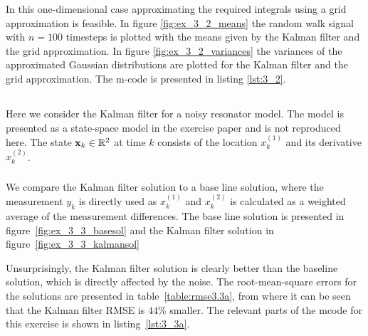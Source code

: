 \documentclass[a4paper,oneside,article]{memoir}
\begin{document}
In this one-dimensional case approximating the required
integrals using a grid approximation is feasible. In figure \ref{fig:ex_3_2_means}
the random walk signal with $n=100$ timesteps is plotted with the means given
by the Kalman filter and the grid approximation. In figure \ref{fig:ex_3_2_variances}
the variances of the approximated Gaussian distributions are plotted for 
the Kalman filter and the grid approximation. The m-code is presented in listing \ref{lst:3_2}. 

\clearpage


\subsection{}\label{sec:3_3}
Here we consider the Kalman filter for a noisy resonator model. The model
is presented as a state-space model in the exercise paper and is not
reproduced here. The state $\mathbf{x}_k\in\mathbb{R}^2$ at time $k$ consists
of the location $x_k^{(1)}$ and its derivative $x_k^{(2)}$. 

\subsubsection{}\label{sec:3_3a}
We compare the Kalman filter solution to a base line solution, where the
measurement $y_k$ is directly used as $x_k^{(1)}$ and $x_k^{(2)}$ is calculated
as a weighted average of the measurement differences. The base line solution is
presented in figure~\ref{fig:ex_3_3_basesol} and the Kalman filter solution in 
figure~\ref{fig:ex_3_3_kalmansol}


Unsurprisingly, the Kalman filter solution is clearly better than the baseline
solution, which is directly affected by the noise. The root-mean-square errors
for the solutions are presented in table~\ref{table:rmse3.3a}, from where
it can be seen that the Kalman filter RMSE is $44$\% smaller. The relevant
parts of the mcode for this exercise is shown in listing~\ref{lst:3_3a}.
\end{document}
